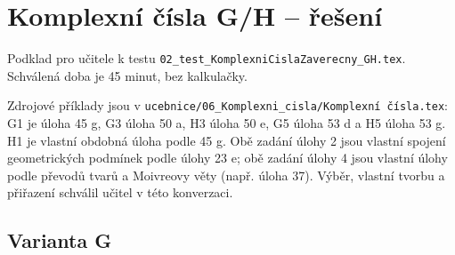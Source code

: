 \documentclass[a4paper,10pt]{article}
\begin{document}
\section*{Komplexní čísla G/H -- řešení}
Podklad pro učitele k testu
\texttt{02\_test\_KomplexniCislaZaverecny\_GH.tex}.
Schválená doba je 45 minut, bez kalkulačky.

Zdrojové příklady jsou v
\texttt{ucebnice/06\_Komplexni\_cisla/Komplexní čísla.tex}:
G1 je úloha 45 g, G3 úloha 50 a, H3 úloha 50 e,
G5 úloha 53 d a H5 úloha 53 g.
H1 je vlastní obdobná úloha podle 45 g.
Obě zadání úlohy 2 jsou vlastní spojení geometrických podmínek
podle úlohy 23 e; obě zadání úlohy 4 jsou vlastní úlohy podle
převodů tvarů a Moivreovy věty (např. úloha 37).
Výběr, vlastní tvorbu a přiřazení schválil učitel v této konverzaci.

\subsection*{Varianta G}
\end{document}
